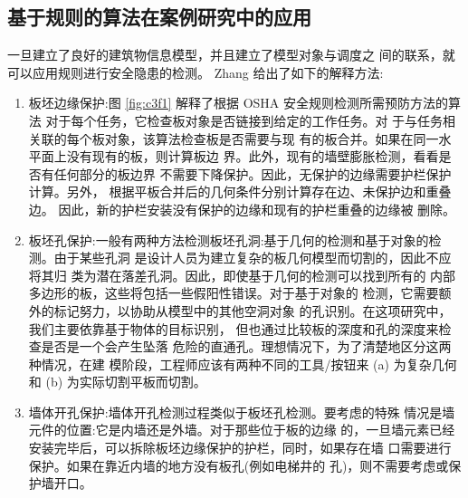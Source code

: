 \subsection{基于规则的算法在案例研究中的应用}

一旦建立了良好的建筑物信息模型，并且建立了模型对象与调度之
间的联系，就可以应用规则进行安全隐患的检测。 Zhang 给出了如下的解释方法:

\begin{enumerate}
    \item 板坯边缘保护:图 \ref{fig:c3f1} 解释了根据 OSHA 安全规则检测所需预防方法的算法
    对于每个任务，它检查板对象是否链接到给定的工作任务。对
    于与任务相关联的每个板对象，该算法检查板是否需要与现
    有的板合并。如果在同一水平面上没有现有的板，则计算板边
    界。此外，现有的墙壁膨胀检测，看看是否有任何部分的板边界
    不需要下降保护。因此，无保护的边缘需要护栏保护计算。另外，
    根据平板合并后的几何条件分别计算存在边、未保护边和重叠边。
    因此，新的护栏安装没有保护的边缘和现有的护栏重叠的边缘被
    删除。
    \item 板坯孔保护:一般有两种方法检测板坯孔洞:基于几何的检测和基于对象的检测。由于某些孔洞
    是设计人员为建立复杂的板几何模型而切割的，因此不应将其归
    类为潜在落差孔洞。因此，即使基于几何的检测可以找到所有的
    内部多边形的板，这些将包括一些假阳性错误。对于基于对象的
    检测，它需要额外的标记努力，以协助从模型中的其他空洞对象
    的孔识别。在这项研究中，我们主要依靠基于物体的目标识别，
    但也通过比较板的深度和孔的深度来检查是否是一个会产生坠落
    危险的直通孔。理想情况下，为了清楚地区分这两种情况，在建
    模阶段，工程师应该有两种不同的工具/按钮来 (a) 为复杂几何和
     (b) 为实际切割平板而切割。
    \item 墙体开孔保护:墙体开孔检测过程类似于板坯孔检测。要考虑的特殊
    情况是墙元件的位置:它是内墙还是外墙。对于那些位于板的边缘
    的，一旦墙元素已经安装完毕后，可以拆除板坯边缘保护的护栏，同时，如果存在墙
    口需要进行保护。如果在靠近内墙的地方没有板孔(例如电梯井的
    孔)，则不需要考虑或保护墙开口。
\end{enumerate}

